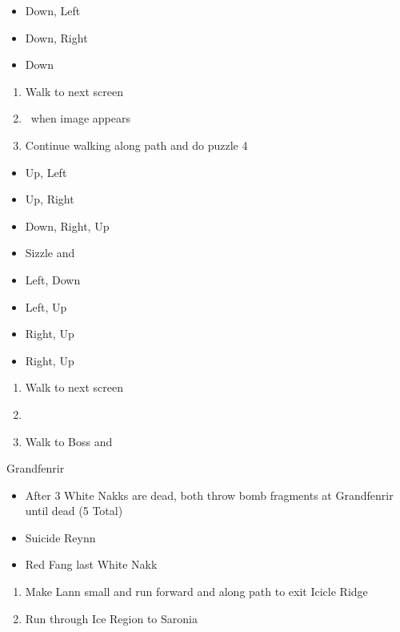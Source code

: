 \begin{puzzle}
	\begin{itemize}
		\item Down, Left
		\item Down, Right
		\item Down
	\end{itemize}
\end{puzzle}
\begin{enumerate}[resume]
	\item Walk to next screen
	\item \cs\ when image appears
	\item Continue walking along path and do puzzle 4
\end{enumerate}
\begin{puzzle}
	\begin{itemize}
		\item Up, Left
		\item Up, Right
		\item Down, Right, Up
		\item Sizzle and 
		\item Left, Down
		\item Left, Up
		\item Right, Up
		\item Right, Up
	\end{itemize}
\end{puzzle}
\begin{enumerate}[resume]
	\item Walk to next screen
	\item \save
	\item Walk to Boss and \cs
\end{enumerate}
\begin{battle}[]{Grandfenrir}
	\begin{itemize}
		\reynnf Fire White Nakk
		\lannf Red Fang White Nakk
		\item After 3 White Nakks are dead, both throw bomb fragments at Grandfenrir until dead (5 Total)
		\item Suicide Reynn
		\item Red Fang last White Nakk
	\end{itemize}
\end{battle}
\begin{enumerate}[resume]
	\item Make Lann small and run forward and along path to exit Icicle Ridge
	\item Run through Ice Region to Saronia
\end{enumerate}